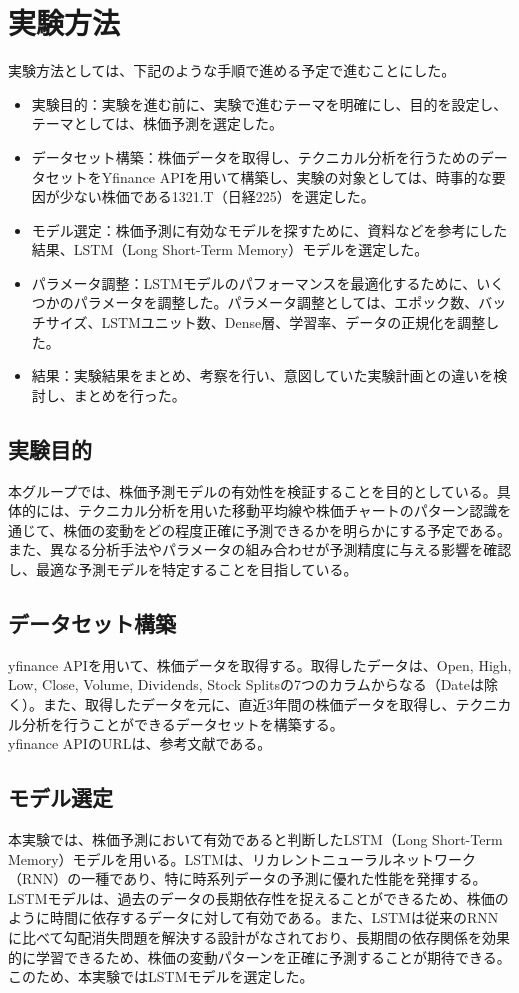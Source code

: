 \documentclass[a4paper, 11pt, titlepage]{jsarticle}
\begin{document}
\section{実験方法}
実験方法としては、下記のような手順で進める予定で進むことにした。
\begin{itemize}
  \item 実験目的：実験を進む前に、実験で進むテーマを明確にし、目的を設定し、テーマとしては、株価予測を選定した。
  \item データセット構築：株価データを取得し、テクニカル分析を行うためのデータセットをYfinance APIを用いて構築し、実験の対象としては、時事的な要因が少ない株価である1321.T（日経225）を選定した。
  \item モデル選定：株価予測に有効なモデルを探すために、資料などを参考にした結果、LSTM（Long Short-Term Memory）モデルを選定した。
  \item パラメータ調整：LSTMモデルのパフォーマンスを最適化するために、いくつかのパラメータを調整した。パラメータ調整としては、エポック数、バッチサイズ、LSTMユニット数、Dense層、学習率、データの正規化を調整した。
  \item 結果：実験結果をまとめ、考察を行い、意図していた実験計画との違いを検討し、まとめを行った。
\end{itemize}
\subsection{実験目的}
\indent 本グループでは、株価予測モデルの有効性を検証することを目的としている。具体的には、テクニカル分析を用いた移動平均線や株価チャートのパターン認識を通じて、株価の変動をどの程度正確に予測できるかを明らかにする予定である。また、異なる分析手法やパラメータの組み合わせが予測精度に与える影響を確認し、最適な予測モデルを特定することを目指している。

\subsection{データセット構築}
\indent yfinance APIを用いて、株価データを取得する。取得したデータは、Open, High, Low, Close, Volume, Dividends, Stock Splitsの7つのカラムからなる（Dateは除く）。また、取得したデータを元に、直近3年間の株価データを取得し、テクニカル分析を行うことができるデータセットを構築する。\\
\indent yfinance APIのURLは、参考文献\cite{yfin}である。

\subsection{モデル選定}
\indent 本実験では、株価予測において有効であると判断したLSTM（Long Short-Term Memory）モデルを用いる。LSTMは、リカレントニューラルネットワーク（RNN）の一種であり、特に時系列データの予測に優れた性能を発揮する。LSTMモデルは、過去のデータの長期依存性を捉えることができるため、株価のように時間に依存するデータに対して有効である。また、LSTMは従来のRNNに比べて勾配消失問題を解決する設計がなされており、長期間の依存関係を効果的に学習できるため、株価の変動パターンを正確に予測することが期待できる。このため、本実験ではLSTMモデルを選定した。
\end{document}

